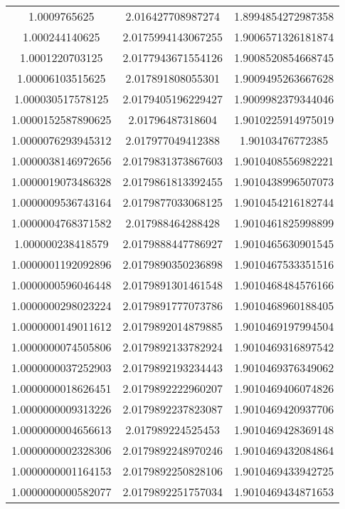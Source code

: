\documentclass{article}
\begin{document}
\begin{center}
\begin{table}[h!]
\begin{tabular}{||c c c||}
     1.0009765625 & 2.016427708987274 & 1.8994854272987358 \\ 
     1.000244140625 & 2.0175994143067255 & 1.9006571326181874 \\ 
     1.0001220703125 & 2.0177943671554126 & 1.9008520854668745 \\ 
     1.00006103515625 & 2.017891808055301 & 1.9009495263667628 \\ 
     1.000030517578125 & 2.0179405196229427 & 1.9009982379344046 \\ 
     1.0000152587890625 & 2.01796487318604 & 1.9010225914975019 \\ 
     1.0000076293945312 & 2.017977049412388 & 1.90103476772385 \\ 
     1.0000038146972656 & 2.0179831373867603 & 1.9010408556982221 \\ 
     1.0000019073486328 & 2.0179861813392455 & 1.9010438996507073 \\ 
     1.0000009536743164 & 2.0179877033068125 & 1.9010454216182744 \\ 
     1.0000004768371582 & 2.017988464288428 & 1.9010461825998899 \\ 
     1.000000238418579 & 2.0179888447786927 & 1.9010465630901545 \\ 
     1.0000001192092896 & 2.0179890350236898 & 1.9010467533351516 \\ 
     1.0000000596046448 & 2.0179891301461548 & 1.9010468484576166 \\ 
     1.0000000298023224 & 2.0179891777073786 & 1.9010468960188405 \\ 
     1.0000000149011612 & 2.0179892014879885 & 1.9010469197994504 \\ 
     1.0000000074505806 & 2.0179892133782924 & 1.9010469316897542 \\ 
     1.0000000037252903 & 2.0179892193234443 & 1.9010469376349062 \\ 
     1.0000000018626451 & 2.0179892222960207 & 1.9010469406074826 \\ 
     1.0000000009313226 & 2.0179892237823087 & 1.9010469420937706 \\ 
     1.0000000004656613 & 2.017989224525453 & 1.9010469428369148 \\ 
     1.0000000002328306 & 2.0179892248970246 & 1.9010469432084864 \\ 
     1.0000000001164153 & 2.0179892250828106 & 1.9010469433942725 \\ 
     1.0000000000582077 & 2.0179892251757034 & 1.9010469434871653 \\ 

\end{tabular}
\end{table}
\end{center}
\end{document}
